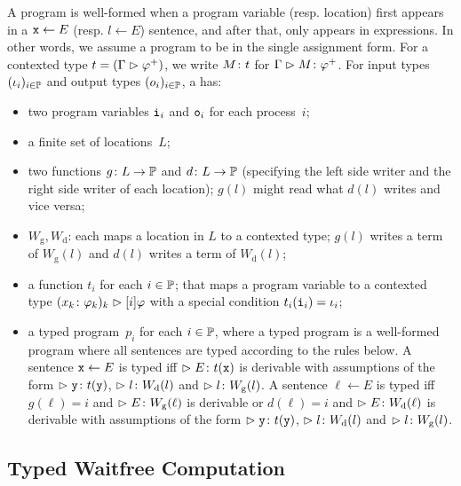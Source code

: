 {\newcommand{\Wg}{W_{\mathrm g}}
\newcommand{\Wd}{W_{\mathrm d}}
A program is well-formed when
a program variable (resp. location) first appears in a $\texttt{x}\leftarrow E$
(resp. $l\leftarrow E$)
sentence, and
after that, only appears in expressions.
In other words, we assume a program to be in the single assignment form.
For a contexted type $t = (\Gamma\vartriangleright{\varphi}^+)$,
we write ${M} \colon{t}$ for
$\Gamma\vartriangleright{M} \colon{{\varphi}^+}$.
For input types $(\iota_i)_{i\in\mathbb{P}}$
and output types $(o_i)_{i\in\mathbb{P}}$,
a  has:
\begin{itemize}
 \item two program variables
      $\texttt{i}_i$ and $\texttt{o}_i$ for each process~$i$;
 \item a finite set of locations~$L$;
 \item two functions $g\colon L\rightarrow \mathbb{P}$
       and $d\colon L\rightarrow
       \mathbb{P}$ (specifying the left side writer and the right side writer of
       each location);
       $g(l)$ might read what $d(l)$ writes and vice versa;
 \item $\Wg, \Wd$: each maps a location in $L$ to a contexted type;
       $g(l)$ writes a term of $\Wg(l)$ and $d(l)$ writes a term of $\Wd(l)$;
 \item a function $t_i$ for each $i\in \mathbb{P}$;
       that maps a program variable to a contexted type
       $({x_k} \colon{\varphi_k})_k \vartriangleright[i]\varphi$ with a special condition
       $t_i(\texttt{i}_i)= \iota_i$;
 \item a typed program~$p_i$ for each $i\in \mathbb{P}$,
       where
       a typed program is a well-formed program where all
       sentences are typed according to the rules below.
       A sentence $\texttt{x} \leftarrow E$ is typed  iff $\vartriangleright E\colon t(\texttt{x})$ is derivable with
       assumptions of the form $\vartriangleright{\texttt{y}} \colon{t(\texttt{y})}$,\quad
       $\vartriangleright{l} \colon{W_{\mathrm d}}(l)$ and
       $\vartriangleright{l} \colon{W_{\mathrm g}}(l)$.
       A sentence $\ell\leftarrow E$ is typed iff
       $g(\ell)=i$ and $\tr\tj{E}{\Wg(\ell)}$ is derivable or
       $d(\ell)=i$ and $\tr\tj{E}{\Wd(\ell)}$ is derivable
       with
       assumptions of the form $\vartriangleright{\texttt{y}} \colon{t(\texttt{y})}$,\quad
       $\vartriangleright{l} \colon{W_{\mathrm d}}(l)$ and
       $\vartriangleright{l} \colon{W_{\mathrm g}}(l)$.
\end{itemize}

\subsection{Typed Waitfree Computation}

}
